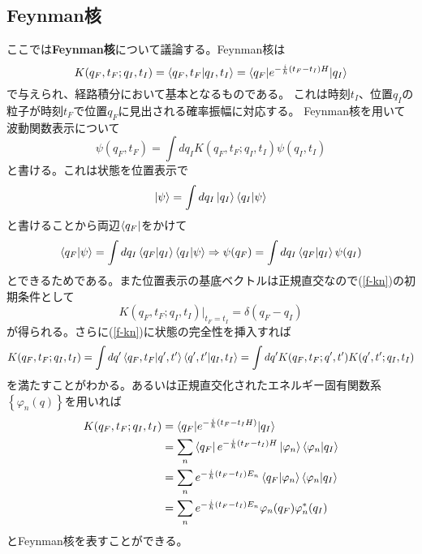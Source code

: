 \documentclass[10pt]{jsarticle}
\newcommand{\nkakko}[1]{\left\{ #1 \right\}} %
\numberwithin{equation}{section}%
\begin{document}
\subsection{Feynman核}
ここでは{\bf Feynman核}について議論する。Feynman核は
\begin{equation}
 \label{f-kn} K(q_{F},t_{F};q_{I},t_{I})=\braket{q_{F},t_{F}|q_{I},t_{I}}=\braket{q_{F}|e^{-\frac{i}{\hbar}(t_{F}-t_{I})H}|q_{I}}
\end{equation}
で与えられ、経路積分において基本となるものである。
これは時刻$t_{I}$、位置$q_{I}$の粒子が時刻$t_{F}$で位置$q_{F}$に見出される確率振幅に対応する。
Feynman核を用いて波動関数表示について
\begin{equation}
  \psi(q_{F},t_{F})=\int dq_{I}K(q_{F},t_{F};q_{I},t_{I})\psi(q_{I},t_{I})
\end{equation}
と書ける。これは状態を位置表示で
\begin{equation}
  \ket{\psi}=\int dq_{I}\ket{q_{I}}\braket{q_{I}|\psi}
\end{equation}
と書けることから両辺$\bra{q_{F}}$をかけて
\begin{equation}
  \braket{q_{F}|\psi}=\int dq_{I}\braket{q_{F}|q_{I}}\braket{q_{I}|\psi}\Rightarrow \psi(q_{F}) =\int dq_{I}\braket{q_{F}|q_{I}}\psi(q_{I})
\end{equation}
とできるためである。また位置表示の基底ベクトルは正規直交なので(\ref{f-kn})の初期条件として
\begin{equation}
  K(q_{F},t_{F};q_{I},t_{I})|_{t_{F}=t_{I}}=\delta (q_{F}-q_{I})
\end{equation}
が得られる。さらに(\ref{f-kn})に状態の完全性を挿入すれば
\begin{equation}
  K(q_{F},t_{F};q_{I},t_{I})=\int dq' \braket{q_{F},t_{F}|q',t'} \braket{q',t'|q_{I},t_{I}}=\int dq' K(q_{F},t_{F};q',t')K(q',t';q_{I},t_{I})
\end{equation}
を満たすことがわかる。あるいは正規直交化されたエネルギー固有関数系$\nkakko{\varphi_{n}(q)}$を用いれば
\begin{align}
  K(q_{F},t_{F};q_{I},t_{I})&=\braket{q_{F}|e^{-\frac{i}{\hbar}(t_{F}-t_{I}H)}|q_{I}}\\
  &=\sum_{n}\bra{q_{F}}e^{-\frac{i}{\hbar}(t_{F}-t_{I})H}\ket{\varphi_{n}} \braket{\varphi_{n}|q_{I}}\\
&=\sum_{n}e^{-\frac{i}{\hbar}(t_{F}-t_{I})E_{n}}\braket{q_{F}|\varphi_{n}} \braket{\varphi_{n}|q_{I}}\\
&=\sum_{n}e^{-\frac{i}{\hbar}(t_{F}-t_{I})E_{n}}\varphi_{n}(q_{F})\varphi_{n}^{*}(q_{I})
\end{align}
とFeynman核を表すことができる。
\end{document}
